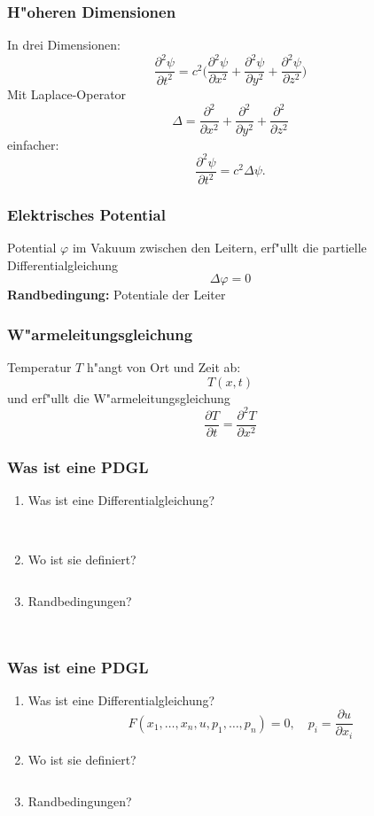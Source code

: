 \documentclass{beamer}
\begin{document}
\begin{frame}
\frametitle{H"oheren Dimensionen}
In drei Dimensionen:
\[
\frac{\partial^2\psi}{\partial t^2}=c^2
\biggl(
\frac{\partial^2\psi}{\partial x^2}
+
\frac{\partial^2\psi}{\partial y^2}
+
\frac{\partial^2\psi}{\partial z^2}
\biggr)
\]
\pause
Mit Laplace-Operator
\[
\Delta
=
\frac{\partial^2}{\partial x^2}
+
\frac{\partial^2}{\partial y^2}
+
\frac{\partial^2}{\partial z^2}
\]
\pause
einfacher:
\[
\frac{\partial^2\psi}{\partial t^2}
=
c^2\Delta \psi.
\]
\end{frame}


\begin{frame}
\frametitle{Elektrisches Potential}
Potential 
$\varphi$ 
im Vakuum zwischen den Leitern,
\pause
erf"ullt die partielle Differentialgleichung
\[
\Delta \varphi =0
\]
\pause
{\bf Randbedingung:} Potentiale der Leiter
\end{frame}

\begin{frame}
\frametitle{W"armeleitungsgleichung}
Temperatur $T$ h"angt von Ort und Zeit ab:
\[
T(x,t)
\]
\pause
und erf"ullt die W"armeleitungsgleichung
\[
\frac{\partial T}{\partial t}=\frac{\partial^2T}{\partial x^2}
\]
\end{frame}

\begin{frame}
\frametitle{Was ist eine PDGL}
\begin{enumerate}
\item Was ist eine Differentialgleichung?
\[
\phantom{
F( x_1,\dots,x_n,u,p_1, \dots,p_n) =0,\quad p_i=\frac{\partial u}{\partial x_i}
}
\]
\item Wo ist sie definiert?
\[
\phantom{
\text{Gebiet $\Omega$, d.~h.~offen}
}
\]
\item Randbedingungen?
\[
\phantom{
\text{$u(x)=g(x)$ oder $\frac{\partial u}{\partial n}=g(x)$ auf
$\partial\Omega$}
}
\]
\end{enumerate}
\end{frame}

\begin{frame}
\frametitle{Was ist eine PDGL}
\begin{enumerate}
\item Was ist eine Differentialgleichung?
\[
F( x_1,\dots,x_n,u,p_1, \dots,p_n) =0,\quad p_i=\frac{\partial u}{\partial x_i}
\]
\item Wo ist sie definiert?
\[
\phantom{
\text{Gebiet $\Omega$, d.~h.~offen}
}
\]
\item Randbedingungen?
\[
\phantom{
\text{$u(x)=g(x)$ oder $\frac{\partial u}{\partial n}=g(x)$ auf
$\partial\Omega$}
}
\]
\end{enumerate}
\end{frame}
\end{document}
